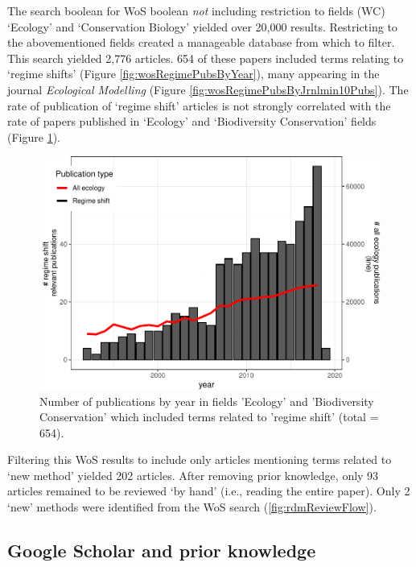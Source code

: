 \documentclass[12pt,twoside,openany]{reedthesis}
\begin{document}
The search boolean for WoS boolean \emph{not} including restriction to fields (WC) `Ecology' and `Conservation Biology' yielded over 20,000 results. Restricting to the abovementioned fields created a manageable database from which to filter. This search yielded 2,776 articles. 654 of these papers included terms relating to `regime shifts' (Figure \ref{fig:wosRegimePubsByYear}), many appearing in the journal \emph{Ecological Modelling} (Figure \ref{fig:wosRegimePubsByJrnlmin10Pubs}). The rate of publication of `regime shift' articles is not strongly correlated with the rate of papers published in `Ecology' and `Biodiversity Conservation' fields (Figure \ref{fig:wosRegimePubsByYearwithNumEcolPubs}).
\begin{figure}

{\centering \includegraphics[width=0.85\linewidth]{_myDissertation_files/figure-latex/wosRegimePubsByYearwithNumEcolPubs-1} 

}

\caption{Number of publications by year in fields 'Ecology' and 'Biodiversity Conservation' which included terms related to 'regime shift' (total = 654).}\label{fig:wosRegimePubsByYearwithNumEcolPubs}
\end{figure}
Filtering this WoS results to include only articles mentioning terms related to `new method' yielded 202 articles. After removing prior knowledge, only 93 articles remained to be reviewed `by hand' (i.e., reading the entire paper). Only 2 `new' methods were identified from the WoS search (\ref{fig:rdmReviewFlow}).

\hypertarget{google-scholar-and-prior-knowledge}{%
\subsection{Google Scholar and prior knowledge}\label{google-scholar-and-prior-knowledge}}
\end{document}
